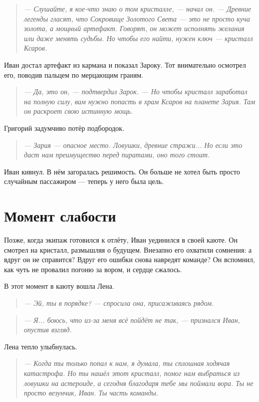 \documentclass[12pt,a4paper]{book}
\newenvironment{dialogue}{\begin{quote}\itshape}{\end{quote}} %
\begin{document}
\begin{dialogue}
--- Слушайте, я кое-что знаю о том кристалле, --- начал он. --- Древние легенды гласят, что Сокровище Золотого Света --- это не просто куча золота, а мощный артефакт. Говорят, он может исполнять желания или даже менять судьбы. Но чтобы его найти, нужен ключ --- кристалл Ксаров.
\end{dialogue}

Иван достал артефакт из кармана и показал Зароку. Тот внимательно осмотрел его, поводив пальцем по мерцающим граням.

\begin{dialogue}
--- Да, это он, --- подтвердил Зарок. --- Но чтобы кристалл заработал на полную силу, вам нужно попасть в храм Ксаров на планете Зария. Там он раскроет свою истинную мощь.
\end{dialogue}

Григорий задумчиво потёр подбородок.

\begin{dialogue}
--- Зария --- опасное место. Ловушки, древние стражи... Но если это даст нам преимущество перед пиратами, оно того стоит.
\end{dialogue}

Иван кивнул. В нём загоралась решимость. Он больше не хотел быть просто случайным пассажиром --- теперь у него была цель.

\section*{Момент слабости}

Позже, когда экипаж готовился к отлёту, Иван уединился в своей каюте. Он смотрел на кристалл, размышляя о будущем. Внезапно его охватили сомнения: а вдруг он не справится? Вдруг его ошибки снова навредят команде? Он вспомнил, как чуть не провалил погоню за вором, и сердце сжалось.

В этот момент в каюту вошла Лена.

\begin{dialogue}
--- Эй, ты в порядке? --- спросила она, присаживаясь рядом.
\end{dialogue}

\begin{dialogue}
--- Я... боюсь, что из-за меня всё пойдёт не так, --- признался Иван, опустив взгляд.
\end{dialogue}

Лена тепло улыбнулась.

\begin{dialogue}
--- Когда ты только попал к нам, я думала, ты сплошная ходячая катастрофа. Но ты нашёл этот кристалл, помог нам выбраться из ловушки на астероиде, а сегодня благодаря тебе мы поймали вора. Ты не просто везунчик, Иван. Ты часть команды.
\end{dialogue}
\end{document}

